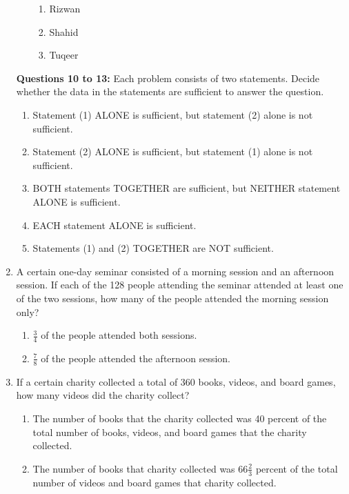 \documentclass[12pt]{article}
\begin{document}
\begin{enumerate}[label=\textbf{\arabic*.}, start=1]
\begin{enumerate}
\begin{enumerate}[label=(\Alph*)]
    \item Rizwan
    \item Shahid
    \item Tuqeer
\end{enumerate}
\end{enumerate}
\vspace{1em}
\noindent\textbf{Questions 10 to 13:} Each problem consists of two statements. Decide whether the data in the statements are sufficient to answer the question.
\begin{enumerate}[label=(\Alph*)]
    \item Statement (1) ALONE is sufficient, but statement (2) alone is not sufficient.
    \item Statement (2) ALONE is sufficient, but statement (1) alone is not sufficient.
    \item BOTH statements TOGETHER are sufficient, but NEITHER statement ALONE is sufficient.
    \item EACH statement ALONE is sufficient.
    \item Statements (1) and (2) TOGETHER are NOT sufficient.
\end{enumerate}

\item  A certain one-day seminar consisted of a morning session and an afternoon session. If each of the 128 people attending the seminar attended at least one of the two sessions, how many of the people attended the morning session only?

\begin{multicols}{2}
\begin{enumerate}[label=(\arabic*)]
    \item $\frac{3}{4}$ of the people attended both sessions.
    \item $\frac{7}{8}$ of the people attended the afternoon session.
\end{enumerate}
\end{multicols}

\item If a certain charity collected a total of 360 books, videos, and board games, how many videos did the charity collect?

\begin{enumerate}[label=(\arabic*)]
    \item The number of books that the charity collected was 40 percent of the total number of books, videos, and board games that the charity collected.
    \item The number of books that charity collected was $66 \frac{2}{3}$ percent of the total number of videos and board games that charity collected.
\end{enumerate}


\end{enumerate}
\end{document}
